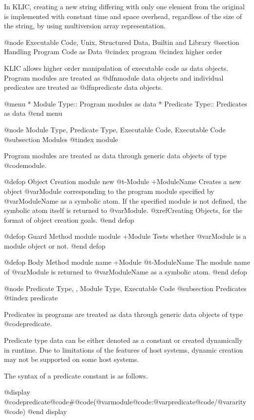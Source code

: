 {{{{In KLIC, creating a new string differing with only one element from the
original is implemented with constant time and space overhead,
regardless of the size of the string, by using multiversion array
representation.

@node Executable Code, Unix, Structured Data, Builtin and Library
@section Handling Program Code as Data
@cindex program
@cindex higher order

KLIC allows higher order manipulation of executable code as data
objects.  Program modules are treated as @dfn{module} data objects and
individual predicates are treated as @dfn{predicate} data
objects.

@menu
* Module Type::                 Program modules as data
* Predicate Type::              Predicates as data
@end menu

@node Module Type, Predicate Type, Executable Code, Executable Code
@subsection Modules
@tindex module

Program modules are treated as data through generic data objects of type
@code{module}.

@defop {Object Creation} module new @t{-}Module +ModuleName
Creates a new object @var{Module} corresponding to the program module
specified by @var{ModuleName} as a symbolic atom.  If the specified
module is not defined, the symbolic atom itself is returned to @var{Module}.
@xref{Creating Objects}, for the format of object creation goals.
@end defop

@defop {Guard Method} module module +Module
Tests whether @var{Module} is a module object or not.
@end defop

@defop {Body Method} module name +Module @t{-}ModuleName
The module name of @var{Module} is returned to @var{ModuleName} as a
symbolic atom.
@end defop

@node Predicate Type,  , Module Type, Executable Code
@subsection Predicates
@tindex predicate

Predicates in programs are treated as data through generic data objects
of type @code{predicate}.

Predicate type data can be either denoted as a constant or created
dynamically in runtime.  Due to limitations of the features of host
systems, dynamic creation may not be supported on some host systems.

The syntax of a predicate constant is as follows.

@display
@code{predicate}@code{#}@code{(}@var{module}@code{:}@var{predicate}@code{/}@var{arity}@code{)}
@end display

}}}}
